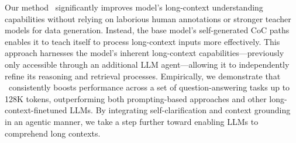 




Our method \method~significantly improves model's long-context understanding capabilities without relying on laborious human annotations or stronger teacher models for data generation. Instead, the base model's self-generated CoC paths enables it to teach itself to process long-context inputs more effectively. This approach harnesses the model’s inherent long-context capabilities—previously only accessible through an additional LLM agent—allowing it to independently refine its reasoning and retrieval processes.
Empirically, we demonstrate that \method~consistently boosts performance across a set of question-answering tasks up to 128K tokens, outperforming both prompting-based approaches and other long-context-finetuned LLMs.
By integrating self-clarification and context grounding in an agentic manner, we take a step further toward enabling LLMs to comprehend long contexts.

